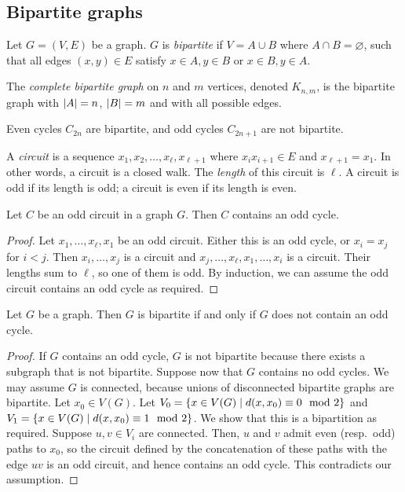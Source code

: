 \subsection{Bipartite graphs}
\begin{definition}
	Let \( G = (V, E) \) be a graph.
	\( G \) is \emph{bipartite} if \( V = A \cup B \) where \( A \cap B = \varnothing \), such that all edges \( (x,y) \in E \) satisfy \( x \in A, y \in B \) or \( x \in B, y \in A \).

	The \emph{complete bipartite graph} on \( n \) and \( m \) vertices, denoted \( K_{n,m} \), is the bipartite graph with \( \abs{A} = n \), \( \abs{B} = m \) and with all possible edges.
\end{definition}
\begin{remark}
	Even cycles \( C_{2n} \) are bipartite, and odd cycles \( C_{2n+1} \) are not bipartite.
\end{remark}
\begin{definition}
	A \emph{circuit} is a sequence \( x_1, x_2, \dots, x_\ell, x_{\ell + 1} \) where \( x_i x_{i+1} \in E \) and \( x_{\ell + 1} = x_1 \).
	In other words, a circuit is a closed walk.
	The \emph{length} of this circuit is \( \ell \).
	A circuit is odd if its length is odd; a circuit is even if its length is even.
\end{definition}
\begin{proposition}
	Let \( C \) be an odd circuit in a graph \( G \).
	Then \( C \) contains an odd cycle.
\end{proposition}
\begin{proof}
	Let \( x_1, \dots, x_\ell, x_1 \) be an odd circuit.
	Either this is an odd cycle, or \( x_i = x_j \) for \( i < j \).
	Then \( x_i, \dots, x_j \) is a circuit and \( x_j, \dots, x_\ell, x_1, \dots, x_i \) is a circuit.
	Their lengths sum to \( \ell \), so one of them is odd.
	By induction, we can assume the odd circuit contains an odd cycle as required.
\end{proof}
\begin{theorem}
	Let \( G \) be a graph.
	Then \( G \) is bipartite if and only if \( G \) does not contain an odd cycle.
\end{theorem}
\begin{proof}
	If \( G \) contains an odd cycle, \( G \) is not bipartite because there exists a subgraph that is not bipartite.
	Suppose now that \( G \) contains no odd cycles.
	We may assume \( G \) is connected, because unions of disconnected bipartite graphs are bipartite.
	Let \( x_0 \in V(G) \).
	Let \( V_0 = \qty{x \in V(G) \mid d(x,x_0) \equiv 0 \mod 2} \) and \( V_1 = \qty{x \in V(G) \mid d(x,x_0) \equiv 1 \mod 2} \).
	We show that this is a bipartition as required.
	Suppose \( u, v \in V_i \) are connected.
	Then, \( u \) and \( v \) admit even (resp.\ odd) paths to \( x_0 \), so the circuit defined by the concatenation of these paths with the edge \( uv \) is an odd circuit, and hence contains an odd cycle.
	This contradicts our assumption.
\end{proof}


